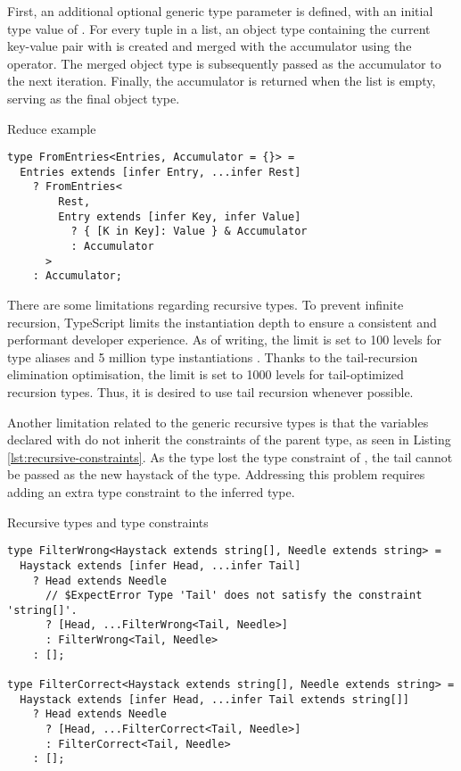 First, an additional optional generic type parameter  is defined, with an initial type value of \code{{}}. For every tuple in a list, an object type containing the current key-value pair with  is created and merged with the accumulator using the \vcode{&} operator. The merged object type is subsequently passed as the accumulator to the next iteration. Finally, the accumulator is returned when the list is empty, serving as the final object type.

\begin{listing}[ht]
  \caption{Reduce example}\label{lst:reduce-type}
  \begin{verbatim}
type FromEntries<Entries, Accumulator = {}> =
  Entries extends [infer Entry, ...infer Rest]
    ? FromEntries<
        Rest,
        Entry extends [infer Key, infer Value]
          ? { [K in Key]: Value } & Accumulator
          : Accumulator
      >
    : Accumulator;
\end{verbatim}
\end{listing}

There are some limitations regarding recursive types. To prevent infinite recursion, TypeScript limits the instantiation depth to ensure a consistent and performant developer experience. As of writing, the limit is set to 100 levels for type aliases and 5 million type instantiations \cite{ImplementationCheckerTs2023}. Thanks to the tail-recursion elimination optimisation, the limit is set to 1000 levels for tail-optimized recursion types. Thus, it is desired to use tail recursion whenever possible.

Another limitation related to the generic recursive types is that the variables declared with  do not inherit the constraints of the parent type, as seen in Listing \ref{lst:recursive-constraints}. As the  type lost the type constraint of , the tail cannot be passed as the new haystack of the  type. Addressing this problem requires adding an extra type constraint to the inferred type.

\begin{listing}[ht]
  \caption{Recursive types and type constraints}\label{lst:recursive-constraints}
  \begin{verbatim}
type FilterWrong<Haystack extends string[], Needle extends string> =
  Haystack extends [infer Head, ...infer Tail]
    ? Head extends Needle
      // $ExpectError Type 'Tail' does not satisfy the constraint 'string[]'.
      ? [Head, ...FilterWrong<Tail, Needle>]
      : FilterWrong<Tail, Needle>
    : [];

type FilterCorrect<Haystack extends string[], Needle extends string> =
  Haystack extends [infer Head, ...infer Tail extends string[]]
    ? Head extends Needle
      ? [Head, ...FilterCorrect<Tail, Needle>]
      : FilterCorrect<Tail, Needle>
    : [];
\end{verbatim}
\end{listing}

